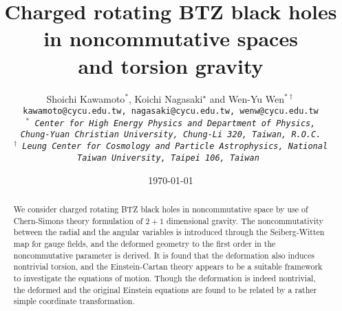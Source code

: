 \documentclass[11pt]{article}
\numberwithin{equation}{section}
\begin{document}


\allowdisplaybreaks

\title{Charged rotating BTZ black holes in noncommutative spaces\\
and torsion gravity \bigskip}

\author{
        Shoichi Kawamoto$^*$,
        Koichi Nagasaki$^\star$
        and
	Wen-Yu Wen$^{*\dagger}$\bigskip\\
\footnotesize\tt kawamoto@cycu.edu.tw, %
nagasaki@cycu.edu.tw,
wenw@cycu.edu.tw
	\\
	$^*$\footnotesize\it 
Center for High Energy Physics and
Department of Physics,\\
\footnotesize\it 
 Chung-Yuan Christian University,
Chung-Li 320, Taiwan, R.O.C.\\
	$^\dagger$\footnotesize\it 
Leung Center for Cosmology and Particle Astrophysics,
National Taiwan University, Taipei 106, Taiwan
	}

\date{\today}

\maketitle



\bigskip

\begin{abstract}
\noindent\normalsize

We consider charged rotating BTZ black holes in noncommutative space by
use of Chern-Simons theory formulation of $2+1$ dimensional gravity.
The noncommutativity between the radial and the angular variables
is introduced through the Seiberg-Witten map for gauge fields,
and the deformed geometry to the first order in the noncommutative parameter
is derived.
It is found that the deformation also induces nontrivial torsion,
and 
the Einstein-Cartan theory appears to be a suitable framework to
investigate the equations of motion.
Though the deformation is indeed nontrivial,
the deformed and the original Einstein equations are 
found to be related by a rather simple coordinate transformation.




\end{abstract}


\clearpage

\setcounter{footnote}{0}
\end{document}

